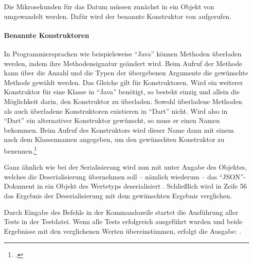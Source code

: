 Die Mikrosekunden für das Datum müssen zunächst in ein Objekt von  umgewandelt werden. 
Dafür wird der benannte Konstruktor  von   aufgerufen.

\paragraph{Benannte Konstruktoren} In Programmiersprachen wie beispielsweise \enquote{Java} können Methoden überladen werden, indem ihre Methodensignatur geändert wird.
Beim Aufruf der Methode kann über die Anzahl und die Typen der übergebenen Argumente die gewünschte Methode gewählt werden.
Das Gleiche gilt für Konstruktoren.
Wird ein weiterer Konstruktor für eine Klasse in \enquote{Java} benötigt, so besteht einzig und allein die Möglichkeit darin, den Konstruktor zu überladen.
Sowohl überladene Methoden als auch überladene Konstruktoren existieren in \enquote{Dart} nicht.
Wird also in \enquote{Dart} ein alternativer Konstruktor gewünscht, so muss er einen Namen bekommen.
Beim Aufruf des Konstruktors wird dieser Name dann mit einem  nach dem Klassennamen angegeben, um den gewünschten Konstruktor zu benennen.\footcite[Vgl.][]{NamedConstructors}


Ganz ähnlich wie bei der Serialisierung wird nun mit  unter Angabe des Objektes,
welches die Deserialisierung übernehmen soll -- nämlich wiederum  -- das \enquote{JSON}-Dokument in ein Objekt des Wertetyps  deserialisiert .
Schließlich wird in Zeile 56 das Ergebnis der Deserialisierung mit dem gewünschten Ergebnis verglichen.



Durch Eingabe des Befehls  in der Kommandozeile
startet die Ausführung aller Tests in der Testdatei.
Wenn alle Tests erfolgreich ausgeführt wurden und beide Ergebnisse mit den verglichenen Werten übereinstimmen,
erfolgt die Ausgabe: .